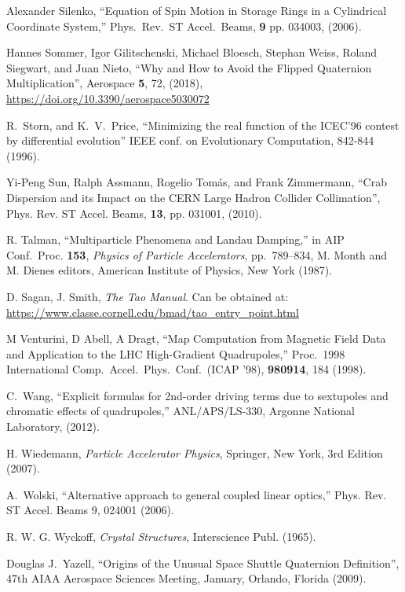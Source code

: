\begin{thebibliography}{XXXXXXX99}
Alexander Silenko, 
``Equation of Spin Motion in Storage Rings in a Cylindrical Coordinate System,''
Phys.\ Rev.\ ST Accel.\ Beams, {\bf 9} pp. 034003, (2006).

Hannes Sommer, Igor Gilitschenski, Michael Bloesch, Stephan Weiss, Roland Siegwart, and Juan Nieto,
``Why and How to Avoid the Flipped Quaternion Multiplication'',
Aerospace {\bf 5}, 72, (2018), \hfill\break
\hspace*{0.3in}
\url{https://doi.org/10.3390/aerospace5030072}

R.~Storn, and K.~V.~Price, ``Minimizing the real function of the
ICEC'96 contest by differential evolution'' IEEE conf. on Evolutionary
Computation, 842-844 (1996).

Yi-Peng Sun, Ralph Assmann, Rogelio Tom\'as, and Frank Zimmermann,
``Crab Dispersion and its Impact on the CERN Large Hadron Collider Collimation'',
Phys. Rev. ST Accel. Beams, {\bf 13}, pp. 031001, (2010).

 R. Talman, ``Multiparticle Phenomena and
Landau Damping,'' in AIP Conf.\ Proc.  {\bf 153}, {\em Physics of
Particle Accelerators}, pp.~789--834, M. Month and M. Dienes editors,
American Institute of Physics, New York (1987).

D. Sagan, J. Smith, {\it The Tao Manual}.
Can be obtained at: \hfill\break
\hspace*{0.3in}
\url{https://www.classe.cornell.edu/bmad/tao_entry_point.html}

M Venturini, D Abell, A Dragt, 
``Map Computation from Magnetic Field Data and Application to the LHC
High-Gradient Quadrupoles,'' 
Proc.\ 1998 International Comp.\ Accel.\ Phys.\ Conf.\ (ICAP '98),
{\bf 980914}, 184 (1998).

C.~Wang,
``Explicit formulas for 2nd-order driving terms due to sextupoles and
chromatic effects of quadrupoles,''
ANL/APS/LS-330, Argonne National Laboratory, (2012).

H. Wiedemann, {\em Particle Accelerator Physics}, Springer, New York, 3rd Edition (2007). 

A.~Wolski,  ``Alternative approach to general coupled linear optics,''
Phys. Rev. ST Accel. Beams 9, 024001 (2006).

R. W. G. Wyckoff, {\em Crystal Structures}, Interscience Publ. (1965).

Douglas J.~Yazell,
``Origins of the Unusual Space Shuttle Quaternion Definition'',
47th AIAA Aerospace Sciences Meeting, January, Orlando, Florida (2009).

\end{thebibliography}
